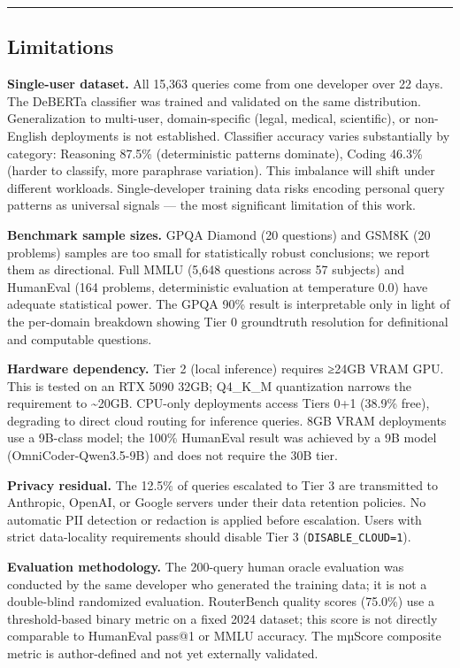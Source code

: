 \begin{center}\rule{0.5\linewidth}{0.5pt}\end{center}

\subsection{Limitations}\label{limitations}

\textbf{Single-user dataset.} All 15,363 queries come from one developer over 22 days. The DeBERTa classifier was trained and validated on the same distribution. Generalization to multi-user, domain-specific (legal, medical, scientific), or non-English deployments is not established. Classifier accuracy varies substantially by category: Reasoning 87.5\% (deterministic patterns dominate), Coding 46.3\% (harder to classify, more paraphrase variation). This imbalance will shift under different workloads. Single-developer training data risks encoding personal query patterns as universal signals --- the most significant limitation of this work.

\textbf{Benchmark sample sizes.} GPQA Diamond (20 questions) and GSM8K (20 problems) samples are too small for statistically robust conclusions; we report them as directional. Full MMLU (5,648 questions across 57 subjects) and HumanEval (164 problems, deterministic evaluation at temperature 0.0) have adequate statistical power. The GPQA 90\% result is interpretable only in light of the per-domain breakdown showing Tier 0 groundtruth resolution for definitional and computable questions.

\textbf{Hardware dependency.} Tier 2 (local inference) requires ≥24GB VRAM GPU. This is tested on an RTX 5090 32GB; Q4\_K\_M quantization narrows the requirement to \textasciitilde20GB. CPU-only deployments access Tiers 0+1 (38.9\% free), degrading to direct cloud routing for inference queries. 8GB VRAM deployments use a 9B-class model; the 100\% HumanEval result was achieved by a 9B model (OmniCoder-Qwen3.5-9B) and does not require the 30B tier.

\textbf{Privacy residual.} The 12.5\% of queries escalated to Tier 3 are transmitted to Anthropic, OpenAI, or Google servers under their data retention policies. No automatic PII detection or redaction is applied before escalation. Users with strict data-locality requirements should disable Tier 3 (\texttt{DISABLE\_CLOUD=1}).

\textbf{Evaluation methodology.} The 200-query human oracle evaluation was conducted by the same developer who generated the training data; it is not a double-blind randomized evaluation. RouterBench quality scores (75.0\%) use a threshold-based binary metric on a fixed 2024 dataset; this score is not directly comparable to HumanEval pass@1 or MMLU accuracy. The mµScore composite metric is author-defined and not yet externally validated.

